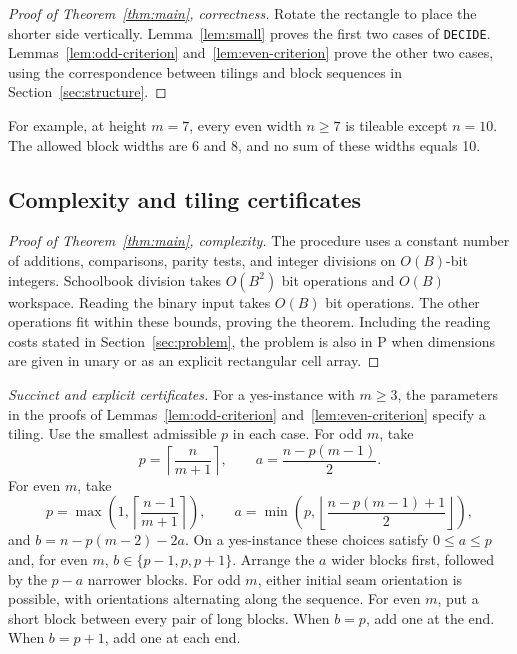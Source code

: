 \documentclass[11pt, reqno]{amsart}
\theoremstyle{definition}
\theoremstyle{remark}
\numberwithin{equation}{section}
\begin{document}
\begin{proof}[Proof of Theorem~\ref{thm:main}, correctness]
    Rotate the rectangle to place the shorter side vertically.
    Lemma~\ref{lem:small} proves the first two cases of \texttt{DECIDE}.
    Lemmas~\ref{lem:odd-criterion} and~\ref{lem:even-criterion} prove
    the other two cases, using the correspondence between tilings and
    block sequences in Section~\ref{sec:structure}.
\end{proof}

For example, at height $m=7$, every even width $n\ge7$ is tileable except
$n=10$. The allowed block widths are 6 and 8, and no sum of these widths
equals 10.

\subsection{Complexity and tiling certificates}
\label{sec:complexity-certificates}

\begin{proof}[Proof of Theorem~\ref{thm:main}, complexity]
    The procedure uses a constant number of additions, comparisons, parity
    tests, and integer divisions on $O(B)$-bit integers. Schoolbook
    division takes $O(B^2)$ bit operations and $O(B)$ workspace.
    Reading the binary input takes $O(B)$ bit operations.
    The other operations fit within these bounds, proving the theorem.
    Including the reading costs stated in Section~\ref{sec:problem}, the problem is
    also in P when dimensions are given in unary or as an explicit
    rectangular cell array.
\end{proof}

\emph{Succinct and explicit certificates.} For a yes-instance with
$m\ge3$, the parameters in the proofs of
Lemmas~\ref{lem:odd-criterion} and~\ref{lem:even-criterion} specify a
tiling. Use the
smallest admissible $p$ in each case. For odd $m$, take
\[
    p=\left\lceil\frac{n}{m+1}\right\rceil,\qquad
    a=\frac{n-p(m-1)}{2}.
\]
For even $m$, take
\[
    p=\max\left(1,\left\lceil\frac{n-1}{m+1}\right\rceil\right),\qquad
    a=\min\left(p,\left\lfloor\frac{n-p(m-1)+1}{2}\right\rfloor\right),
\]
and $b=n-p(m-2)-2a$. On a yes-instance these choices satisfy
$0\le a\le p$ and, for even $m$, $b\in\{p-1,p,p+1\}$.
Arrange the $a$ wider blocks first, followed by the $p-a$ narrower
blocks. For odd $m$, either initial seam orientation is possible, with
orientations alternating along the sequence. For even $m$, put a short
block between every pair of long blocks. When $b=p$, add one at the
end. When $b=p+1$, add one at each end.
\end{document}

